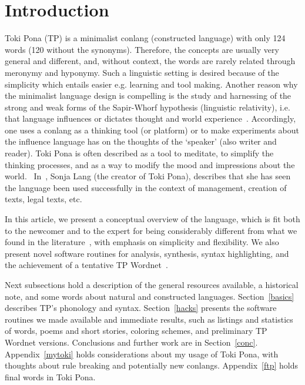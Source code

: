 \documentclass{article}
\begin{document}
\section{Introduction}\label{intro}
Toki Pona (TP) is a minimalist conlang (constructed language)
with only 124 words (120 without the synonyms).
Therefore, the concepts are usually very general and different,
and, without context, the words are rarely related through
meronymy and hyponymy.
Such a linguistic setting is desired because of the simplicity
which entails easier e.g. learning and tool making.
Another reason why the minimalist language design is compelling
is the study and harnessing of the strong and weak forms of
the Sapir-Whorf hypothesis (linguistic relativity),
i.e. that language influences or dictates thought
and world experience~\cite{sapWho}.
Accordingly, one uses a conlang as a thinking tool (or platform)
or to make experiments about the influence language has on
the thoughts of the `speaker' (also writer and reader).
Toki Pona is often described as a tool to meditate,
to simplify the thinking processes, and as a way to modify
the mood and impressions about the world.~\cite{tpLang,kama,tp3,tp4}
In~\cite{interview}, Sonja Lang (the creator of Toki Pona),
describes that she has seen the language been used successfully
in the context of management, creation of texts, legal texts,
etc.

In this article, we present a conceptual overview of the language,
which is fit both to the newcomer and to the expert
for being considerably different
from what we found in the literature~\cite{tpLang,kama,memrise},
with emphasis on simplicity and flexibility.
We also present novel software routines for analysis, synthesis,
syntax highlighting, and the achievement of a tentative TP
Wordnet~\cite{wordnet}.

Next subsections hold a description of the general resources available,
a historical note, and some words about natural and constructed languages.
Section~\ref{basics} describes TP's phonology and syntax.
Section~\ref{hacks} presents the software routines we made available
and immediate results, such as listings and statistics of words,
poems and short stories, coloring schemes, and preliminary TP Wordnet
versions.
Conclusions and further work are in Section~\ref{conc}.
Appendix~\ref{mytoki} holds considerations about my usage of Toki Pona,
with thoughts about rule breaking and potentially new conlangs.
Appendix~\ref{ftp} holds final words in Toki Pona.

\end{document}
